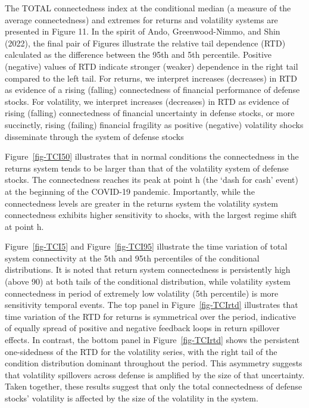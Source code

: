 \documentclass[
  letterpaper,
  DIV=11,
  numbers=noendperiod]{scrartcl}
\begin{document}
The TOTAL connectedness index at the conditional median (a measure of
the average connectedness) and extremes for returns and volatility
systems are presented in Figure 11. In the spirit of Ando,
Greenwood-Nimmo, and Shin (2022), the final pair of Figures illustrate
the relative tail dependence (RTD) calculated as the difference between
the 95th and 5th percentile. Positive (negative) values of RTD indicate
stronger (weaker) dependence in the right tail compared to the left
tail. For returns, we interpret increases (decreases) in RTD as evidence
of a rising (falling) connectedness of financial performance of defense
stocks. For volatility, we interpret increases (decreases) in RTD as
evidence of rising (falling) connectedness of financial uncertainty in
defense stocks, or more succinctly, rising (failing) financial fragility
as positive (negative) volatility shocks disseminate through the system
of defense stocks

Figure~\ref{fig-TCI50} illustrates that in normal conditions the
connectedness in the returns system tends to be larger than that of the
volatility system of defense stocks. The connectedness reaches its peak
at point h (the `dash for cash' event) at the beginning of the COVID-19
pandemic. Importantly, while the connectedness levels are greater in the
returns system the volatility system connectedness exhibits higher
sensitivity to shocks, with the largest regime shift at point h.

Figure~\ref{fig-TCI5} and Figure~\ref{fig-TCI95} illustrate the time
variation of total system connectivity at the 5th and 95th percentiles
of the conditional distributions. It is noted that return system
connectedness is persistently high (above 90) at both tails of the
conditional distribution, while volatility system connectedness in
period of extremely low volatility (5th percentile) is more sensitivity
temporal events. The top panel in Figure~\ref{fig-TCIrtd} illustrates
that time variation of the RTD for returns is symmetrical over the
period, indicative of equally spread of positive and negative feedback
loops in return spillover effects. In contrast, the bottom panel in
Figure~\ref{fig-TCIrtd} shows the persistent one-sidedness of the RTD
for the volatility series, with the right tail of the condition
distribution dominant throughout the period. This asymmetry suggests
that volatility spillovers across defense is amplified by the size of
that uncertainty. Taken together, these results suggest that only the
total connectedness of defense stocks' volatility is affected by the
size of the volatility in the system.
\end{document}
